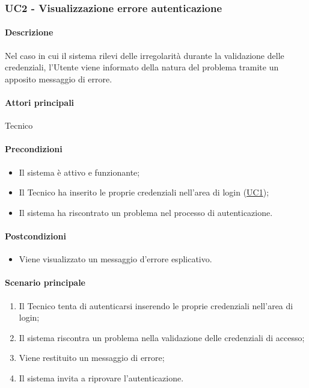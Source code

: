 \subsubsection{UC2 - Visualizzazione errore autenticazione}\label{UC2}


\paragraph*{Descrizione}
Nel caso in cui il sistema rilevi delle irregolarità durante la validazione delle credenziali, l'Utente viene informato della natura del problema tramite un apposito messaggio di errore.

\paragraph*{Attori principali}
Tecnico

\paragraph*{Precondizioni}
\begin{itemize}
  \item Il sistema è attivo e funzionante;
  \item Il Tecnico ha inserito le proprie credenziali nell'area di login (\hyperref[UC1]{UC1});
  \item Il sistema ha riscontrato un problema nel processo di autenticazione.  
\end{itemize}

\paragraph*{Postcondizioni}
\begin{itemize}
  \item Viene visualizzato un messaggio d'errore esplicativo.
\end{itemize}

\paragraph*{Scenario principale}
\begin{enumerate}
  \item Il Tecnico tenta di autenticarsi inserendo le proprie credenziali nell'area di login;
  \item Il sistema riscontra un problema nella validazione delle credenziali di accesso;
  \item Viene restituito un messaggio di errore;
  \item Il sistema invita a riprovare l'autenticazione.
\end{enumerate}

